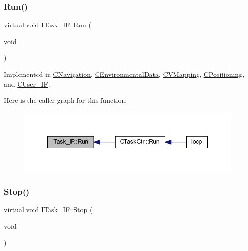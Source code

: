 \subsubsection{\texorpdfstring{Run()}{Run()}}
{\footnotesize\ttfamily virtual void I\+Task\+\_\+\+I\+F\+::\+Run (\begin{DoxyParamCaption}\item[{void}]{ }\end{DoxyParamCaption})\hspace{0.3cm}{\ttfamily [pure virtual]}}



Implemented in \mbox{\hyperlink{class_c_navigation_a86acb1521aab400e542465c8eabed671}{C\+Navigation}}, \mbox{\hyperlink{class_c_environmental_data_a586a729d3aab2873812517d950c91242}{C\+Environmental\+Data}}, \mbox{\hyperlink{class_c_v_mapping_a8f064fcfd01953d7072efd5de23f89ef}{C\+V\+Mapping}}, \mbox{\hyperlink{class_c_positioning_ad0e439dcc95c450548c2806077aeff57}{C\+Positioning}}, and \mbox{\hyperlink{class_c_user___i_f_a1be2e11cd5df5ad0fa5a74a0eb283ec5}{C\+User\+\_\+\+IF}}.

Here is the caller graph for this function\+:\nopagebreak
\begin{figure}[H]
\begin{center}
\leavevmode
\includegraphics[width=347pt]{class_i_task___i_f_ab73cc5879a61d00fc59b72cce32cc6f7_icgraph}
\end{center}
\end{figure}
\mbox{\label{class_i_task___i_f_af5f8fba86704c7e36d0e4681d58300c6}} 
\subsubsection{\texorpdfstring{Stop()}{Stop()}}
{\footnotesize\ttfamily virtual void I\+Task\+\_\+\+I\+F\+::\+Stop (\begin{DoxyParamCaption}\item[{void}]{ }\end{DoxyParamCaption})\hspace{0.3cm}{\ttfamily [pure virtual]}}



